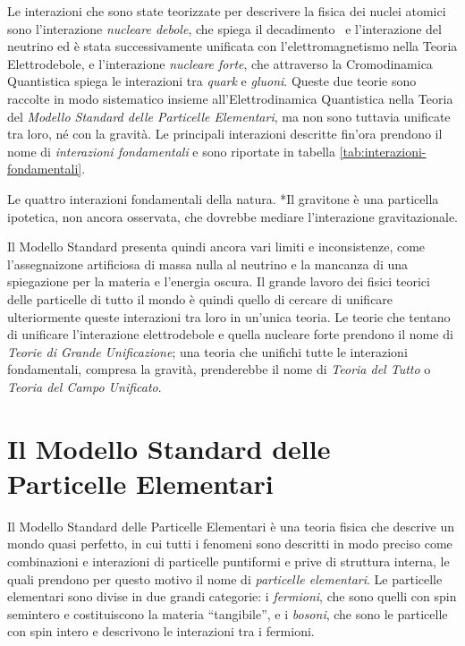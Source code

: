         Le interazioni che sono state teorizzate per descrivere la fisica dei nuclei atomici sono l'interazione \emph{nucleare debole}, che spiega il decadimento \betap\ e l'interazione del neutrino ed è stata successivamente unificata con l'elettromagnetismo nella Teoria Elettrodebole, e l'interazione \emph{nucleare forte}, che attraverso la Cromodinamica Quantistica spiega le interazioni tra \emph{quark} e \emph{gluoni}. Queste due teorie sono raccolte in modo sistematico insieme all'Elettrodinamica Quantistica nella Teoria del \emph{Modello Standard delle Particelle Elementari}, ma non sono tuttavia unificate tra loro, né con la gravità. Le principali interazioni descritte fin'ora prendono il nome di \emph{interazioni fondamentali} e sono riportate in tabella \ref{tab:interazioni-fondamentali}.
        \begin{table}
            \centering
            
            \caption{Le quattro interazioni fondamentali della natura. *Il gravitone è una particella ipotetica, non ancora osservata, che dovrebbe mediare l'interazione gravitazionale.}
            \label{tab:interazioni-fondamentali}
        \end{table}

        Il Modello Standard presenta quindi ancora vari limiti e inconsistenze, come l'assegnaizone artificiosa di massa nulla al neutrino e la mancanza di una spiegazione per la materia e l'energia oscura. Il grande lavoro dei fisici teorici delle particelle di tutto il mondo è quindi quello di cercare di unificare ulteriormente queste interazioni tra loro in un'unica teoria. Le teorie che tentano di unificare l'interazione elettrodebole e quella nucleare forte prendono il nome di \emph{Teorie di Grande Unificazione}; una teoria che unifichi tutte le interazioni fondamentali, compresa la gravità, prenderebbe il nome di \emph{Teoria del Tutto} o \emph{Teoria del Campo Unificato}.

    \section{Il Modello Standard delle Particelle Elementari}
        Il Modello Standard delle Particelle Elementari è una teoria fisica che descrive un mondo quasi perfetto, in cui tutti i fenomeni sono descritti in modo preciso come combinazioni e interazioni di particelle puntiformi e prive di struttura interna, le quali prendono per questo motivo il nome di \emph{particelle elementari}. Le particelle elementari sono divise in due grandi categorie: i \emph{fermioni}, che sono quelli con spin semintero e costituiscono la materia ``tangibile'', e i \emph{bosoni}, che sono le particelle con spin intero e descrivono le interazioni tra i fermioni.

